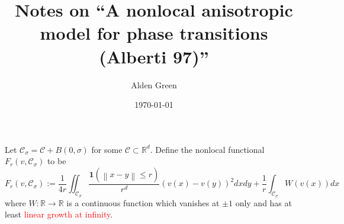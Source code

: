 \documentclass{article}
\newcommand{\Reals}{\mathbb{R}}
\newcommand{\norm}[1]{\left\lVert#1\right\rVert}
\newcommand{\Cset}{\mathcal{C}}
\newcommand{\Csig}{\Cset_{\sigma}}
\newcommand{\1}{\mathbf{1}}
\theoremstyle{alden}
\theoremstyle{aldenthm}
\theoremstyle{remark}
\begin{document}
	
\title{Notes on ``A nonlocal anisotropic model for phase transitions (Alberti 97)''}
\author{Alden Green}
\date{\today}
\maketitle

Let $\Csig = \Cset + B(0,\sigma)$ for some $\Cset \subset \Reals^d$. Define the nonlocal functional $F_{r}(v, \Csig)$ to be
\begin{equation*}
F_r(v, \Csig) := \frac{1}{4r} \iint_{\Csig} \frac{\1(\norm{x - y} \leq r)}{r^d} (v(x) - v(y))^2 dx dy + \frac{1}{r} \int_{\Csig} W(v(x)) dx
\end{equation*}
where $W:\Reals \to \Reals$ is a continuous function which vanishes at $\pm 1$ only and has at least \textcolor{red}{linear growth at infinity}.
\end{document}
